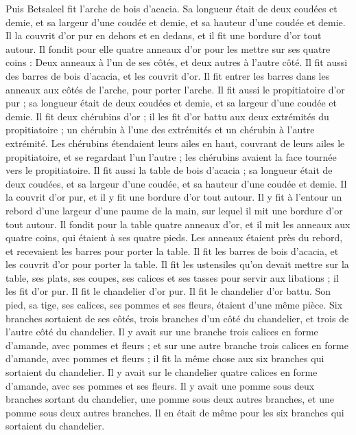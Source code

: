 \begin{multicols}{2}
\VerseOne{}Puis Betsaleel fit l'arche de bois d’acacia. Sa longueur était de deux coudées et demie, et sa largeur d'une coudée et demie, et sa hauteur d'une coudée et demie\FTNT{}.
Il la couvrit d’or pur en dehors et en dedans, et il fit une bordure d'or tout autour.
Il fondit pour elle quatre anneaux d'or pour les mettre sur ses quatre coins : Deux anneaux à l'un de ses côtés, et deux autres à l'autre côté.
Il fit aussi des barres de bois d’acacia, et les couvrit d'or.
Il fit entrer les barres dans les anneaux aux côtés de l'arche, pour porter l'arche.
Il fit aussi le propitiatoire d’or pur ; sa longueur était de deux coudées et demie, et sa largeur d'une coudée et demie.
Il fit deux chérubins d'or ; il les fit d’or battu aux deux extrémités du propitiatoire ;
un chérubin à l’une des extrémités et un chérubin à l’autre extrémité.
Les chérubins étendaient leurs ailes en haut, couvrant de leurs ailes le propitiatoire, et se regardant l’un l’autre ; les chérubins avaient la face tournée vers le propitiatoire.
Il fit aussi la table de bois d’acacia ; sa longueur était de deux coudées, et sa largeur d'une coudée, et sa hauteur d'une coudée et demie.
Il la couvrit d’or pur, et il y fit une bordure d’or tout autour.
Il y fit à l'entour un rebord d’une largeur d’une paume de la main, sur lequel il mit une bordure d’or tout autour.
Il fondit pour la table quatre anneaux d'or, et il mit les anneaux aux quatre coins, qui étaient à ses quatre pieds.
Les anneaux étaient près du rebord, et recevaient les barres pour porter la table.
Il fit les barres de bois d’acacia, et les couvrit d'or pour porter la table.
Il fit les ustensiles qu’on devait mettre sur la table, ses plats, ses coupes, ses calices et ses tasses pour servir aux libations ; il les fit d’or pur.
Il fit le chandelier d’or pur. Il fit le chandelier d’or battu. Son pied, sa tige, ses calices, ses pommes et ses fleurs, étaient d’une même pièce.
Six branches sortaient de ses côtés, trois branches d'un côté du chandelier, et trois de l'autre côté du chandelier.
Il y avait sur une branche trois calices en forme d'amande, avec pommes et fleurs ; et sur une autre branche trois calices en forme d'amande, avec pommes et fleurs ; il fit la même chose aux six branches qui sortaient du chandelier.
Il y avait sur le chandelier quatre calices en forme d'amande, avec ses pommes et ses fleurs.
Il y avait une pomme sous deux branches sortant du chandelier, une pomme sous deux autres branches, et une pomme sous deux autres branches. Il en était de même pour les six branches qui sortaient du chandelier.

\end{multicols}
